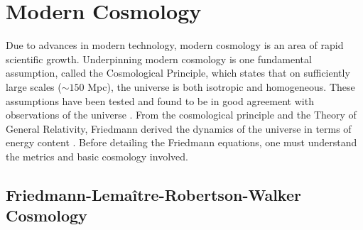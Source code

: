 \documentclass[titlesmallcaps, examinerscopy, copyrightpage]{uqthesis}
\begin{document}
\section{Modern Cosmology}

Due to advances in modern technology, modern cosmology is an area of rapid scientific growth. Underpinning modern cosmology is one fundamental assumption, called the Cosmological Principle, which states that on sufficiently large scales ($\sim 150$ Mpc), the universe is both isotropic and homogeneous. These assumptions have been tested and found to be in good agreement with observations of the universe \citep{ScrimgeourDavis2012, HoggEisenstein2005, HansenBanday2004,SchwarzBacon2015,Lahav2001}. From the cosmological principle and the Theory of General Relativity, Friedmann derived the dynamics of the universe in terms of energy content \citep{RydenPeterson2010}. Before detailing the Friedmann equations, one must understand the metrics and basic cosmology involved.

\subsection{Friedmann-Lema\^itre-Robertson-Walker Cosmology} \label{sec:frw}
\end{document}
